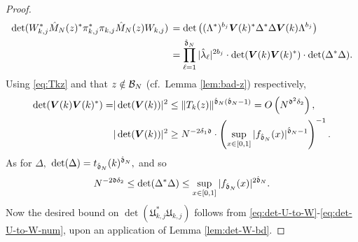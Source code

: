 \documentclass{amsart}
\numberwithin{equation}{section}
\def\corEE{\textcolor{amethyst}}
\def\corEE{}
\def\corAB{}
\def\corABa{}
\def\corOZ{}
\begin{document}
\begin{proof}
 \begin{align}\label{eq:det-U-to-W-num}
 \det(W_{k,j}^* \hat{M}_N(z)^* \pi_{k,j}^*\pi_{k,j} \hat{M}_N(z) W_{k,j}) & \, = \det\left((\Lambda^*)^{b_j} {\bm V}(k)^* \Delta^* \Delta {\bm V}(k) \Lambda^{b_j}\right) \notag\\
 & \, = \prod_{\ell=1}^{\hat{\mathfrak{d}}_N} |\hat{\lambda}_\ell|^{2b_j} \cdot \det({\bm V}(k) {\bm V}(k)^*) \cdot \det(\Delta^* \Delta).
 \end{align}
 \corEE{Using \eqref{eq:Tkz} and that $z\notin \mathcal{B}_N$ (\corABa{cf.}\ Lemma \ref{lem:bad-z}) respectively,
 \[
\begin{aligned}
 \det({\bm V}(k) {\bm V}(k)^*) = &|\det({\bm V}(k))|^2  \le \| T_k(z)\|^{\hat{\mathfrak{d}}_N(\hat{\mathfrak{d}}_N-1)} = O\left(N^{\mathfrak{d}^2 \delta_2}\right),  \\
 &|\det({\bm V}(k))|^2 \ge N^{-2\delta_1 \mathfrak{d}} \cdot \left(\sup_{x \in [0,1]} |f_{\hat{\mathfrak{d}}_N}(x)|^{\hat{\mathfrak{d}}_N-1}\right)^{-1}.
 \end{aligned}
 \]
 As for $\Delta,$ $\det(\Delta) = t_{\hat{\mathfrak{d}}_N}(k)^{\hat{\mathfrak{d}}_N},$ and so
 \[
N^{-2\mathfrak{d}\delta_2} \le  \det(\Delta^*\Delta)\le \sup_{x \in [0,1]}|f_{\hat{\mathfrak{d}}_N}(x)|^{2\hat{\mathfrak{d}}_N}.
 \]}
Now the desired bound on $\det(\mathfrak{U}_{k,j}^*\mathfrak{U}_{k,j})$
follows from \eqref{eq:det-U-to-W}-\eqref{eq:det-U-to-W-num}, upon an application of Lemma \ref{lem:det-W-bd}.

\end{proof}
\end{document}
